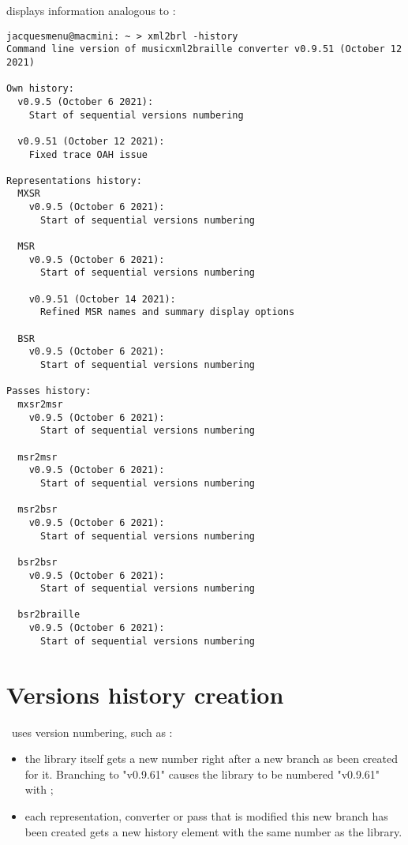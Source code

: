  displays information analogous to :
\begin{lstlisting}[language=Terminal]
jacquesmenu@macmini: ~ > xml2brl -history
Command line version of musicxml2braille converter v0.9.51 (October 12 2021)

Own history:
  v0.9.5 (October 6 2021):
    Start of sequential versions numbering

  v0.9.51 (October 12 2021):
    Fixed trace OAH issue

Representations history:
  MXSR
    v0.9.5 (October 6 2021):
      Start of sequential versions numbering

  MSR
    v0.9.5 (October 6 2021):
      Start of sequential versions numbering

    v0.9.51 (October 14 2021):
      Refined MSR names and summary display options

  BSR
    v0.9.5 (October 6 2021):
      Start of sequential versions numbering

Passes history:
  mxsr2msr
    v0.9.5 (October 6 2021):
      Start of sequential versions numbering

  msr2msr
    v0.9.5 (October 6 2021):
      Start of sequential versions numbering

  msr2bsr
    v0.9.5 (October 6 2021):
      Start of sequential versions numbering

  bsr2bsr
    v0.9.5 (October 6 2021):
      Start of sequential versions numbering

  bsr2braille
    v0.9.5 (October 6 2021):
      Start of sequential versions numbering
\end{lstlisting}

\section{Versions history creation}\label{Versions history creation}

\mf\ uses  version numbering, such as :%
\begin{itemize}
\item the library itself gets a new number right after a new branch as been created for it. Branching to "v0.9.61" causes the library to be numbered "v0.9.61" with ;

\item each representation, converter or pass that is modified this new branch has been created gets a new history element with the same number as the library.
\end{itemize}

